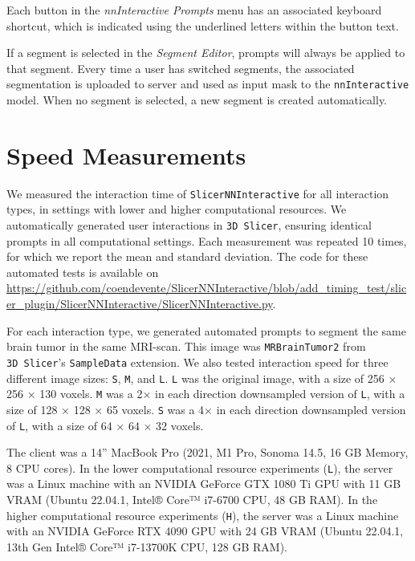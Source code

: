 \documentclass[
]{article}
\begin{document}
Each button in the \emph{nnInteractive Prompts} menu has an associated
keyboard shortcut, which is indicated using the underlined letters
within the button text.

If a segment is selected in the \emph{Segment Editor}, prompts will
always be applied to that segment. Every time a user has switched
segments, the associated segmentation is uploaded to server and used as
input mask to the \texttt{nnInteractive} model. When no segment is
selected, a new segment is created automatically.

\section{Speed Measurements}\label{speed-measurements}

We measured the interaction time of \texttt{SlicerNNInteractive} for all
interaction types, in settings with lower and higher computational
resources. We automatically generated user interactions in
\texttt{3D\ Slicer}, ensuring identical prompts in all computational
settings. Each measurement was repeated 10 times, for which we report
the mean and standard deviation. The code for these automated tests is
available on
\url{https://github.com/coendevente/SlicerNNInteractive/blob/add_timing_test/slicer_plugin/SlicerNNInteractive/SlicerNNInteractive.py}.

For each interaction type, we generated automated prompts to segment the
same brain tumor in the same MRI-scan. This image was
\texttt{MRBrainTumor2} from \texttt{3D\ Slicer}'s \texttt{SampleData}
extension. We also tested interaction speed for three different image
sizes: \texttt{S}, \texttt{M}, and \texttt{L}. \texttt{L} was the
original image, with a size of 256 × 256 × 130 voxels. \texttt{M} was a
2× in each direction downsampled version of \texttt{L}, with a size of
128 × 128 × 65 voxels. \texttt{S} was a 4× in each direction downsampled
version of \texttt{L}, with a size of 64 × 64 × 32 voxels.

The client was a 14'' MacBook Pro (2021, M1 Pro, Sonoma 14.5, 16 GB
Memory, 8 CPU cores). In the lower computational resource experiments
(\texttt{L}), the server was a Linux machine with an NVIDIA GeForce GTX
1080 Ti GPU with 11 GB VRAM (Ubuntu 22.04.1, Intel® Core™ i7-6700 CPU,
48 GB RAM). In the higher computational resource experiments
(\texttt{H}), the server was a Linux machine with an NVIDIA GeForce RTX
4090 GPU with 24 GB VRAM (Ubuntu 22.04.1, 13th Gen Intel® Core™
i7-13700K CPU, 128 GB RAM).
\end{document}
